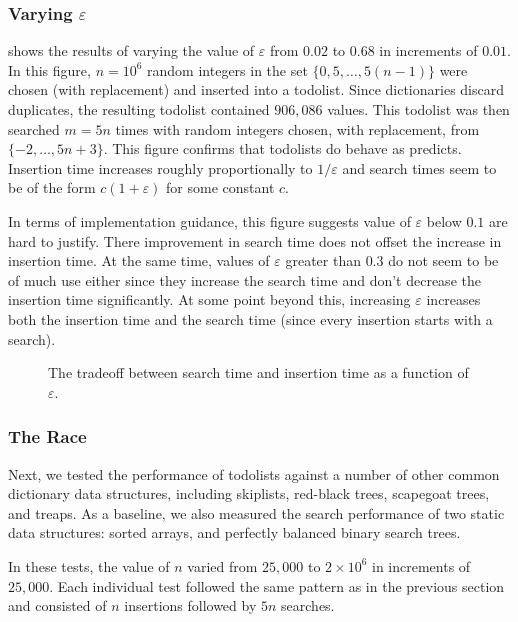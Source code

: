 \documentclass[lotsofwhite]{patmorin}
\newcommand{\eps}{\varepsilon}
\begin{document}
\subsubsection{Varying $\eps$}

 shows the results of varying the value of $\eps$ from
$0.02$ to $0.68$ in increments of $0.01$. In this figure, $n=10^6$
random integers in the set $\{0, 5,\ldots,5(n-1)\}$ were chosen
(with replacement) and inserted into a todolist. Since dictionaries
discard duplicates, the resulting todolist contained $906,086$ values.
This todolist was then searched $m=5n$ times with random integers chosen,
with replacement, from $\{-2,\ldots,5n+3\}$.  This figure confirms
that todolists do behave as  predicts.  Insertion time
increases roughly proportionally to $1/\eps$ and search times seem to be
of the form $c(1+\eps)$ for some constant $c$.

In terms of implementation guidance, this figure suggests value of
$\eps$ below $0.1$ are hard to justify.  There improvement in search
time does not offset the increase in insertion time.  At the same time,
values of $\eps$ greater than $0.3$ do not seem to be of much use either
since they increase the search time and don't decrease the insertion
time significantly. At some point beyond this, increasing $\eps$
increases both the insertion time and the search time (since every
insertion starts with a search).

\begin{figure}
  \centering{}
  \caption{The tradeoff between search time and insertion time as a function of $\eps$.}
\end{figure}

\subsubsection{The Race}

Next, we tested the performance of todolists against a number of other
common dictionary data structures, including skiplists, red-black trees,
scapegoat trees, and treaps. As a baseline, we also measured the search
performance of two static data structures: sorted arrays, and perfectly
balanced binary search trees.

In these tests, the value of $n$ varied from $25,000$ to $2\times 10^6$
in increments of $25,000$.   Each individual test followed the same
pattern as in the previous section and consisted of $n$ insertions
followed by $5n$ searches.
\end{document}
